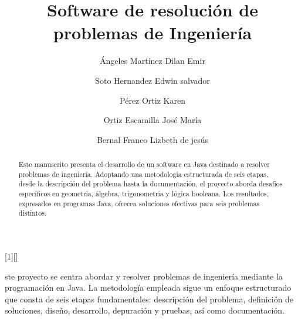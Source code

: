 \documentclass{IEEEcsmag}
\begin{document}
[1][]
{}
{}



\title{Software de resolución de problemas de Ingeniería }


\author{Ángeles Martínez Dilan Emir}

\author{Soto Hernandez Edwin salvador}

\author{Pérez Ortiz Karen }

\author{Ortiz Escamilla José María}

\author{Bernal Franco Lizbeth de jesús}



\begin{abstract}
Este manuscrito presenta el desarrollo de un software en Java destinado a resolver problemas de ingeniería. Adoptando una metodología estructurada de seis etapas, desde la descripción del problema hasta la documentación, el proyecto aborda desafíos específicos en geometría, álgebra, trigonometría y lógica booleana. Los resultados, expresados en programas Java, ofrecen soluciones efectivas para seis problemas distintos. 
\end{abstract}

\maketitle
{}ste proyecto se centra abordar y resolver problemas de ingeniería mediante la programación en Java. La metodología empleada sigue un enfoque estructurado que consta de seis etapas fundamentales: descripción del problema, definición de soluciones, diseño, desarrollo, depuración y pruebas, así como documentación.
\end{document}
